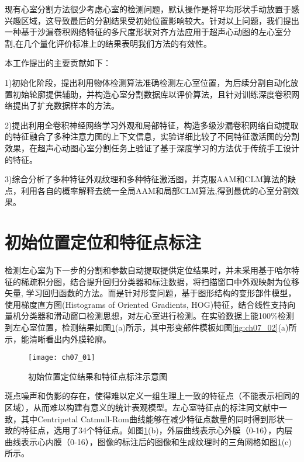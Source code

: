 现有心室分割方法很少考虑心室的检测问题\citep{jixianghu-2016}，默认操作是将平均形状手动放置于感兴趣区域，这导致最后的分割结果受初始位置影响较大。针对以上问题，我们提出一种基于沙漏卷积网络特征的多尺度形状对齐方法应用于超声心动图的左心室分割,在几个量化评价标准上的结果表明我们方法的有效性。

本工作提出的主要贡献如下：

1)初始化阶段，提出利用物体检测算法准确检测左心室位置，为后续分割自动化放置初始轮廓提供辅助，并构造心室分割数据库以评价算法，且针对训练深度卷积网络提出了扩充数据样本的方法。

2)提出利用全卷积神经网络学习外观和局部特征，构造多级沙漏卷积网络自动提取的特征融合了多种注意力图的上下文信息，实验详细比较了不同特征激活图的分割效果，在超声心动图心室分割任务上验证了基于深度学习的方法优于传统手工设计的特征。

3)综合分析了多种特征外观纹理和多种特征激活图，并克服AAM和CLM算法的缺点，利用各自的概率解释去统一全局AAM和局部CLM算法,得到最优的心室分割效果。

\section{初始位置定位和特征点标注}

检测左心室为下一步的分割和参数自动提取提供定位结果时，并未采用基于哈尔特征的稀疏积分图，结合提升回归分类器\citep{Zhou2007}和标注数据，将扫描窗口中外观映射为位移矢量, 学习回归函数的方法。而是针对形变问题，基于图形结构的变形部件模型，使用梯度直方图(Histograms of Oriented Gradients, HOG)特征\citep{Dalal2005}，结合线性支持向量机分类器和滑动窗口检测思想，对左心室进行检测。在实验数据上能100\%检测到左心室位置，检测结果如图\ref{fig:ch07_01}(a)所示，其中形变部件模板如图\ref{fig:ch07_02}(a)所示，能清晰看出内外膜轮廓。
\begin{figure}[!htbp]
\centering
\texttt{[image: ch07\_01]}
\caption{初始位置定位结果和特征点标注示意图}
\label{fig:ch07_01}
\end{figure}
 

斑点噪声和伪影的存在，使得难以定义一组生理上一致的特征点（不能表示相同的区域），从而难以构建有意义的统计表观模型。左心室特征点的标注同文献中一致，其中Centripetal Catmull-Rom曲线能够在减少特征点数量的同时得到形状一致的特征点，选用了34个特征点。如图\ref{fig:ch07_01}(b)，外层曲线表示心外膜（0-16），内层曲线表示心内膜（0-16），图像的标注后的图像和生成纹理时的三角网格如图\ref{fig:ch07_01}(c)所示。

